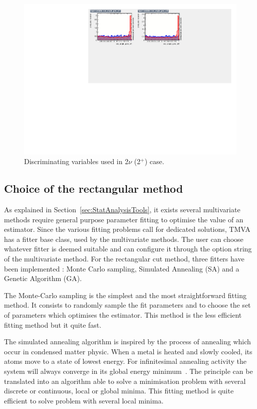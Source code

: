 \documentclass[main.tex]{subfiles}
\begin{document}
\begin{figure} [h!]
\begin{center}
\includegraphics[scale=0.59]{pictures/FinalResults/bb2nu2/150/preselection/variablesBB2nu_2_c.pdf}
\end{center}
\caption{Discriminating variables used in 2$\nu$ (2$^+$) case.}
\label{Variables14TMVA2nu2}
\end{figure}

\FloatBarrier


\subsection{Choice of the rectangular method}\label{sec:ChoiceRCmethod}


\NI As explained in Section~\ref{sec:StatAnalysisTools}, it exists several multivariate methods require general purpose parameter fitting to optimise the value of an estimator. Since the various fitting problems call for dedicated solutions, TMVA has a fitter base class, used by the multivariate methods. The user can choose whatever fitter is deemed suitable and can configure it through the option string of the multivariate method. For the rectangular cut method, three fitters have been implemented : Monte Carlo sampling, Simulated Annealing (SA) and a Genetic Algorithm (GA).


\bigskip


\NI The Monte-Carlo sampling is the simplest and the most straightforward fitting method. It consists to randomly sample the fit parameters and to choose the set of parameters which optimises the estimator. This method is the less efficient fitting method but it quite fast.


\bigskip


\NI The simulated annealing algorithm is inspired by the process of annealing which occur in condensed matter physic. When a metal is heated and slowly cooled, its atoms move to a state of lowest energy. For  infinitesimal  annealing  activity  the system  will  always converge in its global energy minimum~\cite{SimulatedAnnealing}. The principle can be translated into an algorithm able to solve a minimisation problem with several discrete or continuous, local or global minima. This fitting method is quite efficient to solve problem with several local minima.
\end{document}
